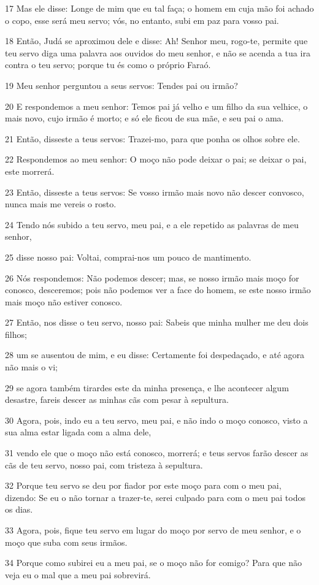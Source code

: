 \par 17 Mas ele disse: Longe de mim que eu tal faça; o homem em cuja mão foi achado o copo, esse será meu servo; vós, no entanto, subi em paz para vosso pai.
\par 18 Então, Judá se aproximou dele e disse: Ah! Senhor meu, rogo-te, permite que teu servo diga uma palavra aos ouvidos do meu senhor, e não se acenda a tua ira contra o teu servo; porque tu és como o próprio Faraó.
\par 19 Meu senhor perguntou a seus servos: Tendes pai ou irmão?
\par 20 E respondemos a meu senhor: Temos pai já velho e um filho da sua velhice, o mais novo, cujo irmão é morto; e só ele ficou de sua mãe, e seu pai o ama.
\par 21 Então, disseste a teus servos: Trazei-mo, para que ponha os olhos sobre ele.
\par 22 Respondemos ao meu senhor: O moço não pode deixar o pai; se deixar o pai, este morrerá.
\par 23 Então, disseste a teus servos: Se vosso irmão mais novo não descer convosco, nunca mais me vereis o rosto.
\par 24 Tendo nós subido a teu servo, meu pai, e a ele repetido as palavras de meu senhor,
\par 25 disse nosso pai: Voltai, comprai-nos um pouco de mantimento.
\par 26 Nós respondemos: Não podemos descer; mas, se nosso irmão mais moço for conosco, desceremos; pois não podemos ver a face do homem, se este nosso irmão mais moço não estiver conosco.
\par 27 Então, nos disse o teu servo, nosso pai: Sabeis que minha mulher me deu dois filhos;
\par 28 um se ausentou de mim, e eu disse: Certamente foi despedaçado, e até agora não mais o vi;
\par 29 se agora também tirardes este da minha presença, e lhe acontecer algum desastre, fareis descer as minhas cãs com pesar à sepultura.
\par 30 Agora, pois, indo eu a teu servo, meu pai, e não indo o moço conosco, visto a sua alma estar ligada com a alma dele,
\par 31 vendo ele que o moço não está conosco, morrerá; e teus servos farão descer as cãs de teu servo, nosso pai, com tristeza à sepultura.
\par 32 Porque teu servo se deu por fiador por este moço para com o meu pai, dizendo: Se eu o não tornar a trazer-te, serei culpado para com o meu pai todos os dias.
\par 33 Agora, pois, fique teu servo em lugar do moço por servo de meu senhor, e o moço que suba com seus irmãos.
\par 34 Porque como subirei eu a meu pai, se o moço não for comigo? Para que não veja eu o mal que a meu pai sobrevirá.

